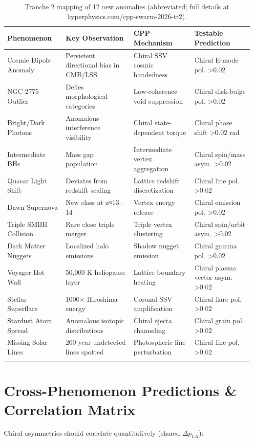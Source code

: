 \documentclass[11pt]{article}
\begin{document}
\begin{longtable}{p{3cm} p{3.5cm} p{3.5cm} p{4cm}}
\toprule
\textbf{Phenomenon} & \textbf{Key Observation} & \textbf{CPP Mechanism} & \textbf{Testable Prediction} \\
\midrule
Cosmic Dipole Anomaly & Persistent directional bias in CMB/LSS & Chiral SSV cosmic handedness & Chiral E-mode pol. >0.02 \\
NGC 2775 Outlier & Defies morphological categories & Low-coherence void suppression & Chiral disk-bulge pol. >0.02 \\
Bright/Dark Photons & Anomalous interference visibility & Chiral state-dependent torque & Chiral phase shift >0.02 rad \\
Intermediate BHs & Mass gap population & Intermediate vertex aggregation & Chiral spin/mass asym. >0.02 \\
Quasar Light Shift & Deviates from redshift scaling & Lattice redshift discretization & Chiral line pol. >0.02 \\
Dawn Supernova & New class at z≈13--14 & Vertex energy release & Chiral emission pol. >0.02 \\
Triple SMBH Collision & Rare close triple merger & Triple vertex clustering & Chiral spin/orbit asym. >0.02 \\
Dark Matter Nuggets & Localized halo emissions & Shadow nugget emission & Chiral gamma pol. >0.02 \\
Voyager Hot Wall & 50,000 K heliopause layer & Lattice boundary heating & Chiral plasma vector asym. >0.02 \\
Stellar Superflare & 1000× Hiroshima energy & Coronal SSV amplification & Chiral flare pol. >0.02 \\
Stardust Atom Spread & Anomalous isotopic distributions & Chiral ejecta channeling & Chiral grain pol. >0.02 \\
Missing Solar Lines & 200-year undetected lines spotted & Photospheric line perturbation & Chiral line pol. >0.02 \\
\bottomrule
\caption{Tranche 2 mapping of 12 new anomalies (abbreviated; full details at hyperphysics.com/cpp-swarm-2026-tr2).}
\end{longtable}

\section{Cross-Phenomenon Predictions \& Correlation Matrix}
Chiral asymmetries should correlate quantitatively (shared $\Delta p_{LR}$):
\end{document}
